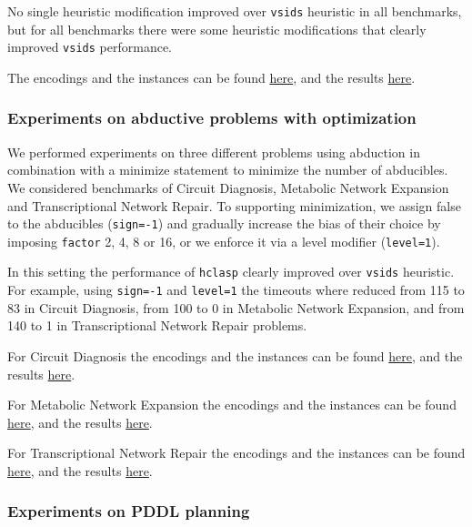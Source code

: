 No single heuristic modification improved over \texttt{vsids} heuristic in all benchmarks,  but for all benchmarks there were some heuristic modifications that clearly improved \texttt{vsids} performance.  

The encodings and the instances can be found \href{benchmarks/static_benchmarks/benchmarks.zip}{here},    and the results \href{benchmarks/static_benchmarks/results.zip}{here}.

\subsubsection{Experiments on abductive problems with optimization}

 We performed experiments on three different problems using abduction in combination with a minimize statement to minimize the number of abducibles. We considered benchmarks of Circuit Diagnosis, Metabolic Network Expansion and Transcriptional Network Repair. To supporting minimization, we assign false to the abducibles (\texttt{sign=-1})  and gradually increase the bias of their choice by imposing \texttt{factor} 2, 4, 8 or 16,  or we enforce it via a level modifier (\texttt{level=1}). 

In this setting the performance of \texttt{hclasp} clearly improved over \texttt{vsids} heuristic. For example, using \texttt{sign=-1} and \texttt{level=1} the timeouts where reduced from 115 to 83 in Circuit Diagnosis, from 100 to 0 in Metabolic Network Expansion, and from 140 to 1 in Transcriptional Network Repair problems. 

For Circuit Diagnosis the encodings and the instances can be found \href{benchmarks/optimization_benchmarks/circuit-diagnosis/circuit-diagnosis-benchmarks.zip}{here},     and the results \href{benchmarks/optimization_benchmarks/circuit-diagnosis/circuit-diagnosis-results.zip}{here}.

For Metabolic Network Expansion the encodings and the instances can be found \href{benchmarks/optimization_benchmarks/bio-expansion/bio-expansion-benchmarks.zip}{here},     and the results \href{benchmarks/optimization_benchmarks/bio-expansion/bio-expansion-results.zip}{here}.

For Transcriptional Network Repair the encodings and the instances can be found \href{benchmarks/optimization_benchmarks/bio-repair/bio-repair-benchmarks.zip}{here},     and the results \href{benchmarks/optimization_benchmarks/bio-repair/bio-repair-results.zip}{here}.

\subsubsection{Experiments on PDDL planning}

